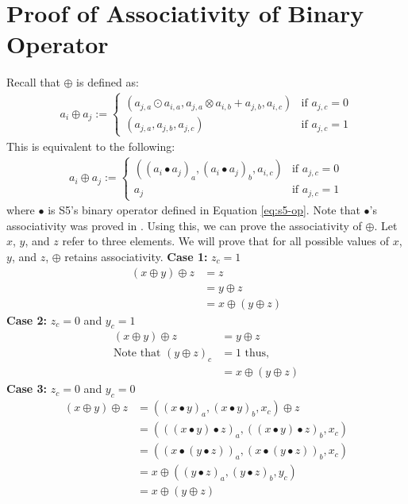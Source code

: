 \documentclass{article}
\newcommand{\oldop}{\bullet}
\newcommand{\newop}{\oplus}
\begin{document}
\section{Proof of Associativity of Binary Operator}
\label{app:proof-assoc}
Recall that $\newop$ is defined as:
\begin{align}
a_i \newop a_j :=
\begin{cases}
(a_{j,a} \odot a_{i,a}, a_{j,a} \otimes a_{i, b} + a_{j, b}, a_{i, c}) & \text{if $a_{j,c}=0$}\\
(a_{j,a}, a_{j,b}, a_{j,c}) & \text{if $a_{j,c}=1$} \nonumber
\end{cases}
\end{align}
This is equivalent to the following:
\begin{align}
a_i \newop a_j :=
\begin{cases}
((a_i \oldop a_j)_a, (a_i \oldop a_j)_b, a_{i, c}) & \text{if $a_{j,c}=0$}\\
a_j & \text{if $a_{j,c}=1$} \nonumber
\end{cases}
\end{align}
where $\oldop$ is S5's binary operator defined in Equation \ref{eq:s5-op}. Note that $\oldop$'s associativity was proved in \citet{smith2022simplified}. Using this, we can prove the associativity of $\newop$.
Let $x$, $y$, and $z$ refer to three elements. We will prove that for all possible values of $x$, $y$, and $z$, $\newop$ retains associativity.
\textbf{Case 1:} $z_c = 1$
\begin{align}
(x \newop y) \newop z &= z \\
&= y \newop z \\
&= x \newop (y \newop z)
\end{align}
\textbf{Case 2:} $z_c = 0$ and $y_c = 1$
\begin{align}
(x \newop y) \newop z &= y \newop z \\
 \text{Note that } (y\newop z)_c &= 1 \text{ thus,} \\
&= x \newop (y \newop z)
\end{align}
\textbf{Case 3:} $z_c = 0$ and $y_c = 0$
\begin{align}
(x \newop y) \newop z &= ((x \oldop y)_a, (x\oldop y)_b, x_c)\newop z \\
&= (((x\oldop y) \oldop z)_a, ((x\oldop y) \oldop z)_b, x_c) \\
&= ((x \oldop (y \oldop z))_a, (x \oldop (y \oldop z))_b, x_c) \\
&= x \newop ((y \oldop z)_a, (y \oldop z)_b, y_c) \\
&= x \newop (y \newop z)
\end{align}
\newpage
\end{document}
